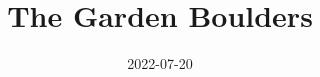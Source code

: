 \documentclass[10pt]{report}
\begin{document}
\title{The Garden Boulders}
\date{2022-07-20}
\maketitle

\newcommand\chapterColor{MidnightBlue}
\twocolumn


\renewcommand\chapterColor{BrickRed}

\renewcommand\chapterColor{BurntOrange}

\renewcommand\chapterColor{PineGreen}

\renewcommand\chapterColor{RoyalPurple}

\renewcommand\chapterColor{Aquamarine}
\renewcommand\chapterColor{MidnightBlue}

\end{document}

